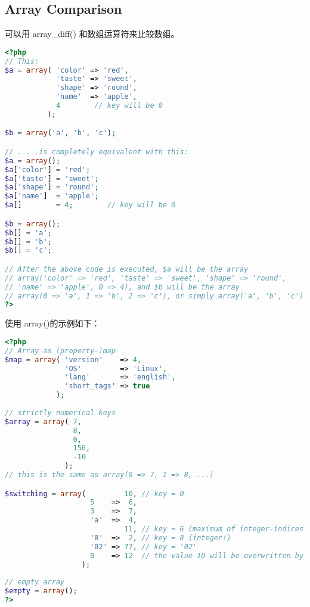 \subsection{Array Comparison}

可以用 array\_diff() 和数组运算符来比较数组。

\begin{lstlisting}[language=PHP]
<?php
// This:
$a = array( 'color' => 'red',
            'taste' => 'sweet',
            'shape' => 'round',
            'name'  => 'apple',
            4        // key will be 0
          );

$b = array('a', 'b', 'c');

// . . .is completely equivalent with this:
$a = array();
$a['color'] = 'red';
$a['taste'] = 'sweet';
$a['shape'] = 'round';
$a['name']  = 'apple';
$a[]        = 4;        // key will be 0

$b = array();
$b[] = 'a';
$b[] = 'b';
$b[] = 'c';

// After the above code is executed, $a will be the array
// array('color' => 'red', 'taste' => 'sweet', 'shape' => 'round', 
// 'name' => 'apple', 0 => 4), and $b will be the array 
// array(0 => 'a', 1 => 'b', 2 => 'c'), or simply array('a', 'b', 'c').
?>
\end{lstlisting}


使用 array()的示例如下：

\begin{lstlisting}[language=PHP]
<?php
// Array as (property-)map
$map = array( 'version'    => 4,
              'OS'         => 'Linux',
              'lang'       => 'english',
              'short_tags' => true
            );
            
// strictly numerical keys
$array = array( 7,
                8,
                0,
                156,
                -10
              );
// this is the same as array(0 => 7, 1 => 8, ...)

$switching = array(         10, // key = 0
                    5    =>  6,
                    3    =>  7, 
                    'a'  =>  4,
                            11, // key = 6 (maximum of integer-indices was 5)
                    '8'  =>  2, // key = 8 (integer!)
                    '02' => 77, // key = '02'
                    0    => 12  // the value 10 will be overwritten by 12
                  );
                  
// empty array
$empty = array();         
?>

\end{lstlisting}



